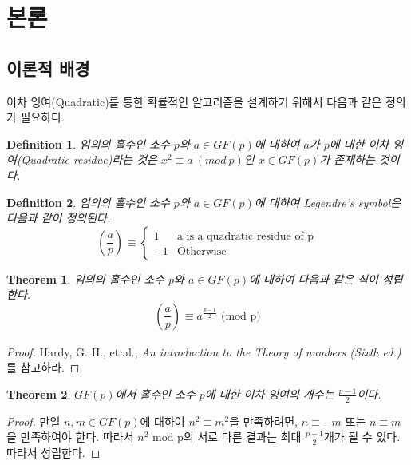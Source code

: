 \documentclass[a4paper]{article}
\newcommand{\Leg}[3][]{\left(\frac{#2}{#3}\right)_{#1}}
\newtheorem{theorem}{Theorem}
\newtheorem{definition}{Definition}
\begin{document}
    \section{본론}
    \subsection{이론적 배경}
        이차 잉여(Quadratic)를 통한 확률적인 알고리즘을 설계하기 위해서 다음과 같은 정의가 필요하다.
        \begin{definition}
            임의의 홀수인 소수 $p$와 $a \in GF(p)$에 대하여 $a$가 $p$에 대한 이차 잉여(Quadratic residue)라는 것은
            $x^{2} \equiv a \ (mod \ p)$인 $x \in GF(p)$가 존재하는 것이다.
        \end{definition}
        \begin{definition}
            임의의 홀수인 소수 $p$와 $a \in GF(p)$에 대하여 Legendre's symbol은 다음과 같이 정의된다.
            \begin{equation}
                \Leg{a}{p} \equiv 
                \begin{cases}
                    1 & \text{a is a quadratic residue of p}\\
                    -1 & \text{Otherwise}
                \end{cases}
            \end{equation}
        \end{definition}
        \begin{theorem}
            \label{thm1}
            임의의 홀수인 소수 $p$와 $a \in GF(p)$에 대하여 다음과 같은 식이 성립한다.
            \begin{equation}
                \Leg{a}{p} \equiv a^{\frac{p-1}{2}} \text{ (mod p)}
            \end{equation}
        \end{theorem}
        \begin{proof}
            Hardy, G. H., et al., \textit{An introduction to the Theory of numbers (Sixth ed.)} \cite{hardy_heath-brown_wright_2011}를 참고하라.
        \end{proof}
        \begin{theorem}
            $GF(p)$에서 홀수인 소수 $p$에 대한 이차 잉여의 개수는 $\frac{p-1}{2}$이다.
        \end{theorem}
        \begin{proof}
            만일 $n,m \in GF(p)$에 대하여 $n^{2} \equiv m^{2}$을 만족하려면, $n \equiv -m$ 또는 $n \equiv m$을 만족하여야 한다.
            따라서 $n^{2} \text{ mod p}$의 서로 다른 결과는 최대 $\frac{p-1}{2}$개가 될 수 있다. 따라서 성립한다.
        \end{proof}
\end{document}
